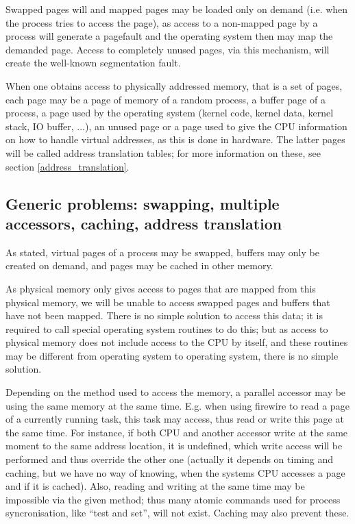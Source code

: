 Swapped pages will and mapped pages may be loaded only on demand (i.e. when the
process tries to access the page), as access to a non-mapped page by a process
will generate a pagefault and the operating system then may map the demanded
page.  Access to completely unused pages, via this mechanism, will create the
well-known segmentation fault.

When one obtains access to physically addressed memory, that is a set of pages,
each page may be a page of memory of a random process, a buffer page of a
process, a page used by the operating system (kernel code, kernel data, kernel
stack, IO buffer, ...), an unused page or a page used to give the CPU
information on how to handle virtual addresses, as this is done in hardware.
The latter pages will be called address translation tables; for more information
on these, see section \ref{address_translation}.

\subsection{Generic problems: swapping, multiple accessors, caching, address
translation}

As stated, virtual pages of a process may be swapped, buffers may only be
created on demand, and pages may be cached in other memory.

As physical memory only gives access to pages that are mapped from this
physical memory, we will be unable to access swapped pages and buffers that
have not been mapped. There is no simple solution to access this data; it is
required to call special operating system routines to do this; but as access to
physical memory does not include access to the CPU by itself, and these
routines may be different from operating system to operating system, there is
no simple solution.

Depending on the method used to access the memory, a parallel accessor may be
using the same memory at the same time. E.g. when using firewire to read a page
of a currently running task, this task may access, thus read or write this page
at the same time. For instance, if both CPU and another accessor write at the
same moment to the same address location, it is undefined, which write access
will be performed and thus override the other one (actually it depends on timing
and caching, but we have no way of knowing, when the systems CPU accesses a page
and if it is cached). Also, reading and writing at the same time may be
impossible via the given method; thus many atomic commands used for process
syncronisation, like ``test and set'', will not exist.  Caching may also prevent
these.

